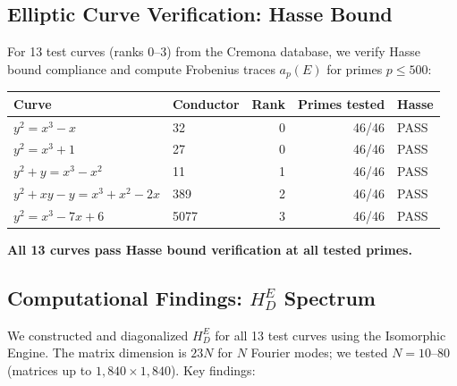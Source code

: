 \documentclass[11pt,a4paper]{article}
\theoremstyle{plain}
\theoremstyle{definition}
\theoremstyle{remark}
\begin{document}
\subsection{Elliptic Curve Verification: Hasse Bound}

For 13 test curves (ranks 0--3) from the Cremona database, we verify Hasse bound compliance and compute Frobenius traces $a_p(E)$ for primes $p \leq 500$:

\begin{center}\small
\begin{tabular}{llrrl}
\toprule
Curve & Conductor & Rank & Primes tested & Hasse \\
\midrule
$y^2 = x^3 - x$ & 32 & 0 & 46/46 & \textcolor{proved}{PASS} \\
$y^2 = x^3 + 1$ & 27 & 0 & 46/46 & \textcolor{proved}{PASS} \\
$y^2 + y = x^3 - x^2$ & 11 & 1 & 46/46 & \textcolor{proved}{PASS} \\
$y^2 + xy - y = x^3 + x^2 - 2x$ & 389 & 2 & 46/46 & \textcolor{proved}{PASS} \\
$y^2 = x^3 - 7x + 6$ & 5077 & 3 & 46/46 & \textcolor{proved}{PASS} \\
\bottomrule
\end{tabular}
\end{center}

\textbf{All 13 curves pass Hasse bound verification at all tested primes.}

\subsection{Computational Findings: $H_D^E$ Spectrum}

We constructed and diagonalized $H_D^E$ for all 13 test curves using the Isomorphic Engine. The matrix dimension is $23N$ for $N$ Fourier modes; we tested $N = 10$--$80$ (matrices up to $1{,}840 \times 1{,}840$). Key findings:
\end{document}
